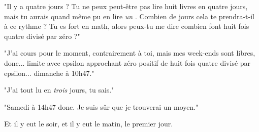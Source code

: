 "Il y a quatre jours ? Tu ne peux peut-être pas lire huit livres en quatre jours, mais tu aurais quand même pu en lire \emph{un} . Combien de jours cela te prendra-t-il à ce rythme ? Tu es fort en math, alors peux-tu me dire combien font huit fois quatre divisé par zéro ?"

"J'ai cours pour le moment, contrairement à toi, mais mes week-ends sont libres, donc... limite avec epsilon approchant zéro positif de huit fois quatre divisé par epsilon... dimanche à 10h47."

"J'ai tout lu en \emph{trois}  jours, tu sais."

"Samedi à 14h47 donc. Je suis sûr que je trouverai un moyen."

Et il y eut le soir, et il y eut le matin, le premier jour.

